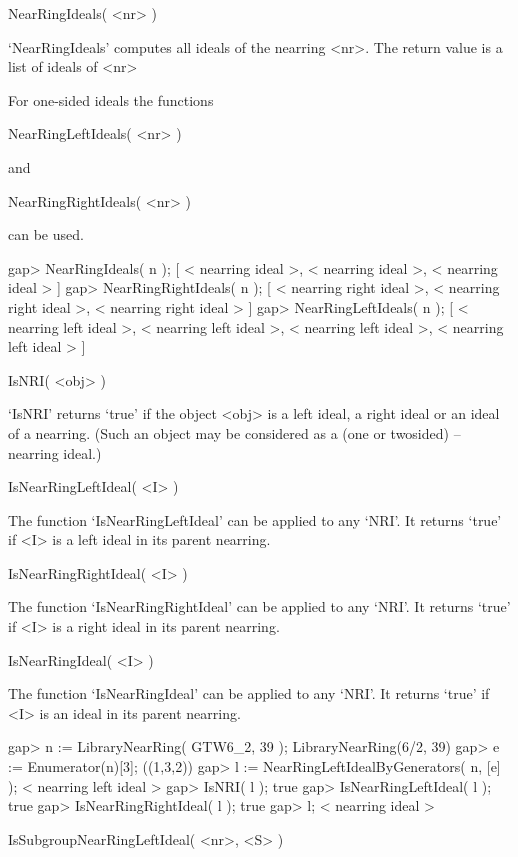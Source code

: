 \>NearRingIdeals( <nr> )

`NearRingIdeals'  computes all ideals of the nearring <nr>. The return value
is a list of ideals of <nr>

For one-sided ideals the functions

\>NearRingLeftIdeals( <nr> )

and

\>NearRingRightIdeals( <nr> )

can be used.

\beginexample
    gap> NearRingIdeals( n );
    [ < nearring ideal >, < nearring ideal >, < nearring ideal > ]
    gap> NearRingRightIdeals( n );
    [ < nearring right ideal >, < nearring right ideal >, 
      < nearring right ideal > ]
    gap> NearRingLeftIdeals( n );
    [ < nearring left ideal >, < nearring left ideal >, < nearring left ideal >, 
      < nearring left ideal > ]
\endexample



\>IsNRI( <obj> )

`IsNRI' returns `true' if the object <obj> is a left ideal, a right ideal or
an ideal of a nearring. (Such an object may be considered as a (one or
twosided) {\GAP} -- nearring ideal.)

\>IsNearRingLeftIdeal( <I> )

The function `IsNearRingLeftIdeal' can be applied to any `NRI'.
It returns `true' if <I> is a left ideal in its parent nearring.

\>IsNearRingRightIdeal( <I> )

The function `IsNearRingRightIdeal' can be applied to any `NRI'.
It returns `true' if <I> is a right ideal in its parent nearring.

\>IsNearRingIdeal( <I> )

The function `IsNearRingIdeal' can be applied to any `NRI'.
It returns `true' if <I> is an ideal in its parent nearring.

\beginexample
    gap> n := LibraryNearRing( GTW6_2, 39 );                      
    LibraryNearRing(6/2, 39)
    gap> e := Enumerator(n)[3];
    ((1,3,2))
    gap> l := NearRingLeftIdealByGenerators( n, [e] );
    < nearring left ideal >
    gap> IsNRI( l );
    true
    gap> IsNearRingLeftIdeal( l );
    true
    gap> IsNearRingRightIdeal( l );
    true
    gap> l;
    < nearring ideal >
\endexample

\>IsSubgroupNearRingLeftIdeal( <nr>, <S> )

